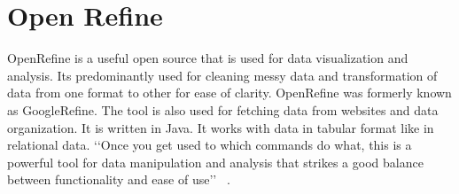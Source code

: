 \section{Open Refine}
OpenRefine is a useful open source that is used for data visualization
and analysis.  Its predominantly used for cleaning messy data and
transformation of data from one format to other for ease of clarity.
OpenRefine was formerly known as GoogleRefine. The tool is also used
for fetching data from websites and data organization.
It is written in Java. It works with data in tabular format like in
relational data. ‘‘Once you get used to which commands do what, this is a powerful tool
for data manipulation and analysis that strikes a good balance between
functionality and ease of use’’ ~\cite{hid-sp18-417-openrefine}.

